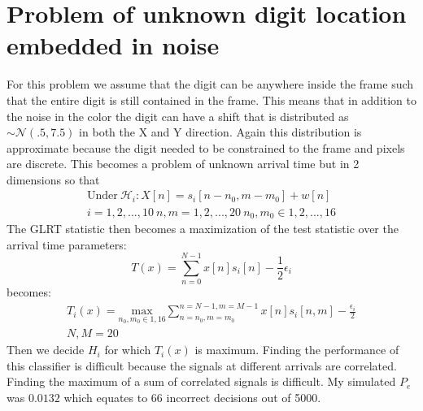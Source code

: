 \documentclass[12pt]{article}
\begin{document}
\section{Problem of unknown digit location embedded in noise}
	For this problem we assume that the digit can be anywhere inside the frame such that
		the entire digit is still contained in the frame.
	This means that in addition to the noise in the color the digit can have a shift
		that is distributed as $\sim \mathcal{N}(.5,7.5)$ in both the X and Y direction.
	Again this distribution is approximate because the digit needed to be constrained to
		the frame and pixels are discrete.
	This becomes a problem of unknown arrival time but in 2 dimensions so that
	\begin{gather*}
		\text{Under} \ \mathcal{H}_i: X[n] = s_i[n-n_0,m-m_0] + w[n] \\
		i = 1,2,...,10 \ n,m=1,2,...,20 \ n_0,m_0 \in 1,2,...,16
	\end{gather*}
	The GLRT statistic then becomes a maximization of the test statistic over the
		arrival time parameters:
	\begin{equation}
		T(x) = \sum_{n=0}^{N-1}x[n]s_i[n] -\frac{1}{2}\epsilon_i
	\end{equation}
	becomes:
	\begin{gather*}
		T_i(x) = \underset{n_0,m_0 \in 1,16}{\text{max}}\sum_{n=n_0,m=m_0}^{n=N-1,m=M-1} 
		x[n]s_i[n,m] - \frac{\epsilon_i}{2} \\
		N,M = 20
	\end{gather*}
	Then we decide $H_i$ for which $T_i(x)$ is maximum.
	Finding the performance of this classifier is difficult because the signals at 
		different	arrivals are correlated.
	Finding the maximum of a sum of correlated signals is difficult.
	My simulated $P_e$ was $0.0132$ which equates to 66 incorrect decisions out of 5000.
\end{document}
